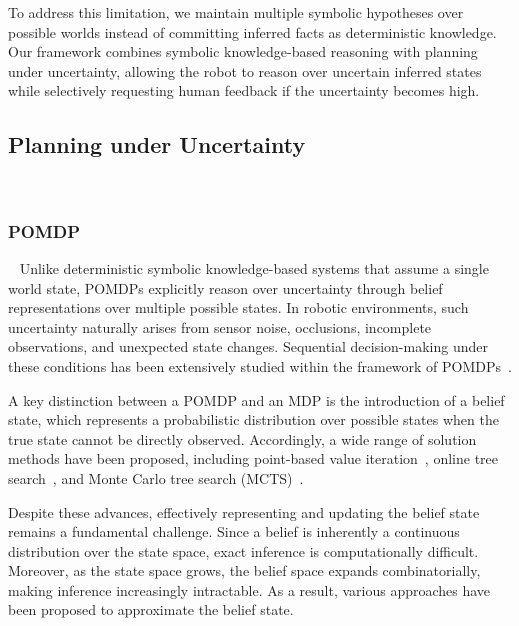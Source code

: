 To address this limitation, we maintain multiple symbolic hypotheses over possible worlds instead of committing inferred facts as deterministic knowledge. Our framework combines symbolic knowledge-based reasoning with planning under uncertainty, allowing the robot to reason over uncertain inferred states while selectively requesting human feedback if the uncertainty becomes high.



\subsection{Planning under Uncertainty}~\label{rel:PlanningUncertainty}


\subsubsection{POMDP}~\label{rel:pu_pomdp}
Unlike deterministic symbolic knowledge-based systems that assume a single world state, POMDPs explicitly reason over uncertainty through belief representations over multiple possible states. In robotic environments, such uncertainty naturally arises from sensor noise, occlusions, incomplete observations, and unexpected state changes. Sequential decision-making under these conditions has been extensively studied within the framework of POMDPs~\cite{somani2013despot,bai2015intention,cramer2021probabilistic,bravo2019use}.

A key distinction between a POMDP and an MDP is the introduction of a belief state, which represents a probabilistic distribution over possible states when the true state cannot be directly observed. Accordingly, a wide range of solution methods have been proposed, including point-based value iteration~\cite{pineau2003point}, online tree search~\cite{ross2008online}, and Monte Carlo tree search (MCTS)~\cite{silver2010monte}.

Despite these advances, effectively representing and updating the belief state remains a fundamental challenge. Since a belief is inherently a continuous distribution over the state space, exact inference is computationally difficult. Moreover, as the state space grows, the belief space expands combinatorially, making inference increasingly intractable. As a result, various approaches have been proposed to approximate the belief state.

